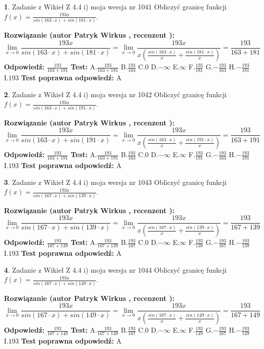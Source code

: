 \documentclass[12pt, a4paper]{article}
\theoremstyle{definition} %
\newtheorem{zad}{}
\newcommand{\zadStart}[1]{\begin{zad}#1\newline}
\newcommand{\zadStop}{\end{zad}}
\newcommand{\rozwStart}[2]{\noindent \textbf{Rozwiązanie (autor #1 , recenzent #2): }\newline}
\newcommand{\rozwStop}{\newline}
\newcommand{\odpStart}{\noindent \textbf{Odpowiedź:}\newline}
\newcommand{\odpStop}{\newline}
\newcommand{\testStart}{\noindent \textbf{Test:}\newline}
\newcommand{\testStop}{\newline}
\newcommand{\kluczStart}{\noindent \textbf{Test poprawna odpowiedź:}\newline}
\newcommand{\kluczStop}{\newline}
\begin{document}
\zadStart{Zadanie z Wikieł Z 4.4 i) moja wersja nr 1041}
Obliczyć granicę funkcji $f(x)=\frac{193x}{sin(163\cdot x) +sin(181\cdot x)}$.
\zadStop
\rozwStart{Patryk Wirkus}{}
$$\lim\limits_{x\to 0}\frac{193x}{sin(163\cdot x) +sin(181\cdot x)}=\lim\limits_{x\to 0}\frac{193x}{x(\frac{sin(163\cdot x)}{x}+\frac{sin(181\cdot x)}{x})}=\frac{193}{163+181}$$
\rozwStop
\odpStart
$\frac{193}{163+181}$
\odpStop
\testStart
A.$\frac{193}{163+181}$
B.$\frac{193}{163}$
C.$0$
D.$-\infty$
E.$\infty$
F.$\frac{193}{181}$
G.$-\frac{193}{163}$
H.$-\frac{193}{181}$
I.$193$
\testStop
\kluczStart
A
\kluczStop



\zadStart{Zadanie z Wikieł Z 4.4 i) moja wersja nr 1042}
Obliczyć granicę funkcji $f(x)=\frac{193x}{sin(163\cdot x) +sin(191\cdot x)}$.
\zadStop
\rozwStart{Patryk Wirkus}{}
$$\lim\limits_{x\to 0}\frac{193x}{sin(163\cdot x) +sin(191\cdot x)}=\lim\limits_{x\to 0}\frac{193x}{x(\frac{sin(163\cdot x)}{x}+\frac{sin(191\cdot x)}{x})}=\frac{193}{163+191}$$
\rozwStop
\odpStart
$\frac{193}{163+191}$
\odpStop
\testStart
A.$\frac{193}{163+191}$
B.$\frac{193}{163}$
C.$0$
D.$-\infty$
E.$\infty$
F.$\frac{193}{191}$
G.$-\frac{193}{163}$
H.$-\frac{193}{191}$
I.$193$
\testStop
\kluczStart
A
\kluczStop



\zadStart{Zadanie z Wikieł Z 4.4 i) moja wersja nr 1043}
Obliczyć granicę funkcji $f(x)=\frac{193x}{sin(167\cdot x) +sin(139\cdot x)}$.
\zadStop
\rozwStart{Patryk Wirkus}{}
$$\lim\limits_{x\to 0}\frac{193x}{sin(167\cdot x) +sin(139\cdot x)}=\lim\limits_{x\to 0}\frac{193x}{x(\frac{sin(167\cdot x)}{x}+\frac{sin(139\cdot x)}{x})}=\frac{193}{167+139}$$
\rozwStop
\odpStart
$\frac{193}{167+139}$
\odpStop
\testStart
A.$\frac{193}{167+139}$
B.$\frac{193}{167}$
C.$0$
D.$-\infty$
E.$\infty$
F.$\frac{193}{139}$
G.$-\frac{193}{167}$
H.$-\frac{193}{139}$
I.$193$
\testStop
\kluczStart
A
\kluczStop



\zadStart{Zadanie z Wikieł Z 4.4 i) moja wersja nr 1044}
Obliczyć granicę funkcji $f(x)=\frac{193x}{sin(167\cdot x) +sin(149\cdot x)}$.
\zadStop
\rozwStart{Patryk Wirkus}{}
$$\lim\limits_{x\to 0}\frac{193x}{sin(167\cdot x) +sin(149\cdot x)}=\lim\limits_{x\to 0}\frac{193x}{x(\frac{sin(167\cdot x)}{x}+\frac{sin(149\cdot x)}{x})}=\frac{193}{167+149}$$
\rozwStop
\odpStart
$\frac{193}{167+149}$
\odpStop
\testStart
A.$\frac{193}{167+149}$
B.$\frac{193}{167}$
C.$0$
D.$-\infty$
E.$\infty$
F.$\frac{193}{149}$
G.$-\frac{193}{167}$
H.$-\frac{193}{149}$
I.$193$
\testStop
\kluczStart
A
\kluczStop
\end{document}
